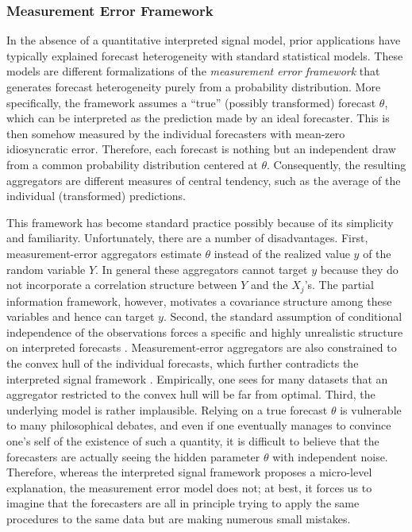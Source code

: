 \documentclass[11pt]{article}
\theoremstyle{definition}
\theoremstyle{definition}
\begin{document}
\subsubsection{Measurement Error Framework}
In the absence of a quantitative
interpreted signal model, prior applications have typically explained forecast heterogeneity  with standard statistical models. These models are different formalizations of  the \textit{measurement error framework} that generates forecast heterogeneity purely from a probability distribution. More specifically, the framework assumes a ``true'' (possibly transformed) forecast
$\theta$, which can be interpreted as the prediction made by an ideal forecaster. This is then somehow measured by the individual forecasters with mean-zero idiosyncratic error.  Therefore, each forecast is nothing but an independent draw from a common
probability distribution centered at $\theta$.
Consequently, the resulting aggregators are different measures of central tendency, such as the average of the individual (transformed) predictions.


This framework has become standard practice possibly because of its simplicity and familiarity.  Unfortunately, there are a number of disadvantages. First, measurement-error aggregators estimate $\theta$ instead of the realized value $y$ of the random variable $Y$. In general these aggregators cannot target $y$ because they do not incorporate a correlation structure between $Y$ and the $X_{j}$'s. The partial information framework, however, motivates a covariance structure among these variables and hence can target $y$. 
Second, the standard assumption of conditional independence of the observations forces a specific and highly
unrealistic structure on interpreted forecasts \citep{hong2009interpreted}. Measurement-error aggregators are also constrained to
the convex hull of the individual forecasts, which further contradicts the
interpreted signal framework \citep{parunak2013characterizing}. Empirically, one sees
for many datasets that an aggregator restricted to the convex hull
will be far from optimal. Third,  the
underlying model is rather implausible. Relying on a true forecast $\theta$ is vulnerable to
many philosophical debates, and even if one eventually manages to
convince one's self of the existence of such a quantity, it is
difficult to believe that the forecasters are actually seeing the
hidden parameter $\theta$ with independent noise. Therefore, whereas the
interpreted signal framework proposes a micro-level explanation, the
measurement error model does not; at best, it forces us to imagine that
the forecasters are all in principle trying to apply the same
procedures to the same data but are making numerous small mistakes. 
\end{document}
